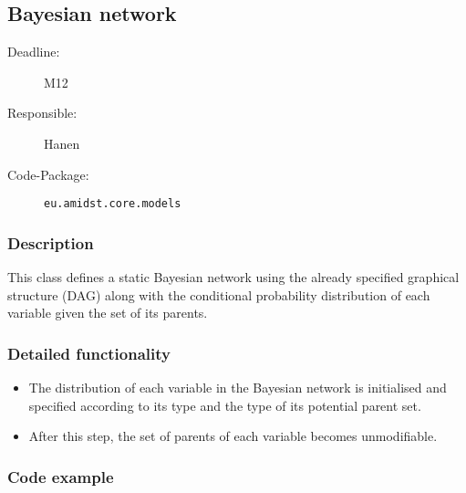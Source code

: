 \newpage
\subsection{Bayesian network}
\label{BNs:ID}

\begin{description}
\item[Deadline:] M12
\item[Responsible:] Hanen
\item[Code-Package:] \texttt{eu.amidst.core.models}
\end{description}

\subsubsection*{Description}

This class defines a static Bayesian network using the already specified graphical structure (DAG) along with the conditional probability distribution of each variable given the set of its parents.  

\subsubsection*{Detailed functionality}

\begin{itemize}

\item The distribution of each variable in the Bayesian network is initialised and specified according to its type and the type of its potential parent set. 

\item After this step, the set of parents of each variable becomes unmodifiable.

\end{itemize}


\subsubsection*{Code example}

